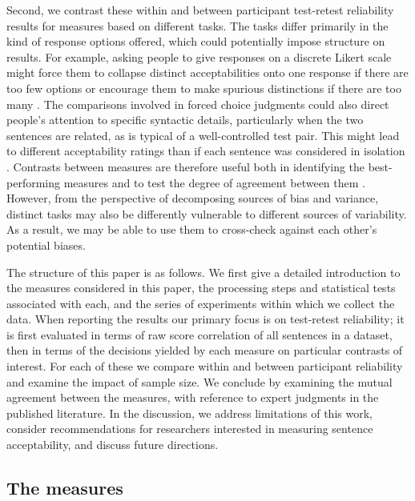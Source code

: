 \documentclass[doc]{apa6}
\begin{document}
Second, we contrast these within and between participant test-retest reliability results for measures based on different tasks. The tasks differ primarily in the kind of response options offered, which could potentially impose structure on results. For example, asking people to give responses on a discrete Likert scale might force them to collapse distinct acceptabilities onto one response if there are too few options or encourage them to make spurious distinctions if there are too many \citep{carifio2008debatelikert,schutze1996empiricalbase,schutze2011linguisticevidence}. The comparisons involved in forced choice judgments could also direct people's attention to specific syntactic details, particularly when the two sentences are related, as is typical of a well-controlled test pair. This might lead to different acceptability ratings than if each sentence was considered in isolation \citep{cornips2005standardising}. Contrasts between measures are therefore useful both in identifying the best-performing measures \citep{sprouse2013formalinformal,sprousealmeida2017sensitivitypower} and to test the degree of agreement between them \citep{weskott2011informativity,schutze2011linguisticevidence,sprouse2012revisitingadgerscoresyntax}. However, from the perspective of decomposing sources of bias and variance, distinct tasks may also be differently vulnerable to different sources of variability. As a result, we may be able to use them to cross-check against each other's potential biases.

The structure of this paper is as follows. We first give a detailed introduction to the measures considered in this paper, the processing steps and statistical tests associated with each, and the series of experiments within which we collect the data. When reporting the results our primary focus is on test-retest reliability; it is first evaluated in terms of raw score correlation of all sentences in a dataset, then in terms of the decisions yielded by each measure on particular contrasts of interest. For each of these we compare within and between participant reliability and examine the impact of sample size. We conclude by examining the mutual agreement between the measures, with reference to expert judgments in the published literature. In the discussion, we address limitations of this work, consider recommendations for researchers interested in measuring sentence acceptability, and discuss future directions.

\subsection{The measures}
\end{document}
